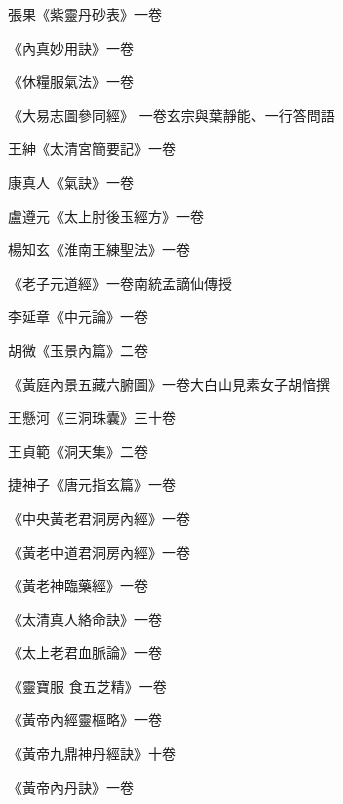 \begin{pinyinscope}
 張果《紫靈丹砂表》一卷



 《內真妙用訣》一卷



 《休糧服氣法》一卷



 《大易志圖參同經》
 一卷玄宗與葉靜能、一行答問語



 王紳《太清宮簡要記》一卷



 康真人《氣訣》一卷



 盧遵元《太上肘後玉經方》一卷



 楊知玄《淮南王練聖法》一卷



 《老子元道經》一卷南統孟謫仙傳授



 李延章《中元論》一卷



 胡微《玉景內篇》二卷



 《黃庭內景五藏六腑圖》一卷大白山見素女子胡愔撰



 王懸河《三洞珠囊》三十卷



 王貞範《洞天集》二卷



 捷神子《唐元指玄篇》一卷



 《中央黃老君洞房內經》一卷



 《黃老中道君洞房內經》一卷



 《黃老神臨藥經》一卷



 《太清真人絡命訣》一卷



 《太上老君血脈論》一卷



 《靈寶服
 食五芝精》一卷



 《黃帝內經靈樞略》一卷



 《黃帝九鼎神丹經訣》十卷



 《黃帝內丹訣》一卷




\end{pinyinscope}
